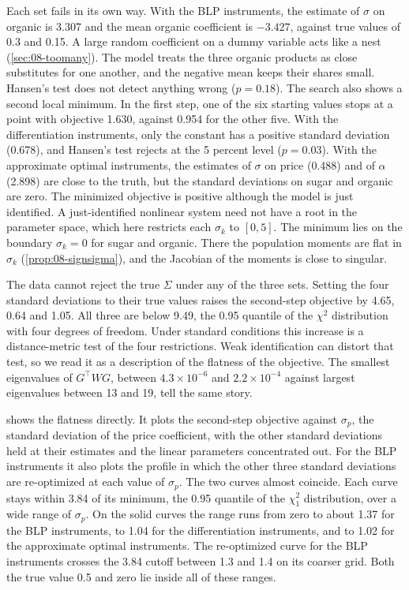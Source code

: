 Each set fails in its own way. With the BLP instruments, the estimate of $\sigma$ on organic is 3.307 and the mean
organic coefficient is $-3.427$, against true values of 0.3 and 0.15. A large random coefficient on a dummy variable
acts like a nest (\cref{sec:08-toomany}). The model treats the three organic products as close substitutes for one
another, and the negative mean keeps their shares small. Hansen's test does not detect anything wrong ($p = 0.18$). The
search also shows a second local minimum. In the first step, one of the six starting values stops at a point with
objective 1.630, against 0.954 for the other five. With the differentiation instruments, only the constant has a
positive standard deviation (0.678), and Hansen's test rejects at the 5 percent level ($p = 0.03$). With the approximate
optimal instruments, the estimates of $\sigma$ on price (0.488) and of $\alpha$ (2.898) are close to the truth, but the
standard deviations on sugar and organic are zero. The minimized objective is positive although the model is just
identified. A just-identified nonlinear system need not have a root in the parameter space, which here restricts each
$\sigma_k$ to $[0, 5]$. The minimum lies on the boundary $\sigma_k = 0$ for sugar and organic. There the population
moments are flat in $\sigma_k$ (\cref{prop:08-signsigma}), and the Jacobian of the moments is close to singular.

The data cannot reject the true $\Sigma$ under any of the three sets. Setting the four standard deviations to their
true values raises the second-step objective by 4.65, 0.64 and 1.05. All three are below 9.49, the 0.95 quantile of the
$\chi^2$ distribution with four degrees of freedom. Under standard conditions this increase is a
distance-metric test of the four restrictions. Weak identification can distort that test, so we read it as a
description of the flatness of the objective. The smallest eigenvalues of $G^\top WG$, between $4.3\times10^{-6}$ and
$2.2\times10^{-4}$ against largest eigenvalues between 13 and 19, tell the same story.

 shows the flatness directly. It plots the second-step objective against $\sigma_p$, the standard
deviation of the price coefficient, with the other standard deviations held at their estimates and the linear
parameters concentrated out. For the BLP instruments it also plots the profile in which the other three standard
deviations are re-optimized at each value of $\sigma_p$. The two curves almost coincide. Each curve stays within 3.84
of its minimum, the 0.95 quantile of the $\chi^2_1$ distribution, over a wide range of $\sigma_p$. On the solid curves
the range runs from zero to about 1.37 for the BLP instruments, to 1.04 for the differentiation instruments, and to
1.02 for the approximate optimal instruments. The re-optimized curve for the BLP instruments crosses the 3.84 cutoff
between 1.3 and 1.4 on its coarser grid. Both the true value 0.5 and zero lie inside all of these ranges.

